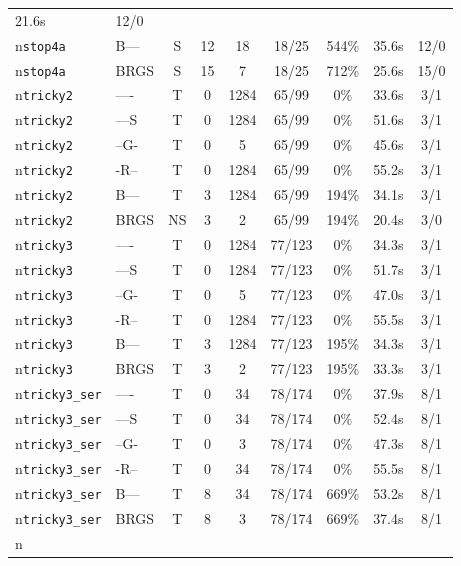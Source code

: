 \begin{tabular}{llccccccc}
21.6s & 12/0 \\n\texttt{stop4a} & B--- & S & 12 & 18 & 18/25 & 544\% & 35.6s & 12/0 \\n\texttt{stop4a} & BRGS & S & 15 & 7 & 18/25 & 712\% & 25.6s & 15/0 \\n\texttt{tricky2} & ---- & T & 0 & 1284 & 65/99 & 0\% & 33.6s & 3/1 \\n\texttt{tricky2} & ---S & T & 0 & 1284 & 65/99 & 0\% & 51.6s & 3/1 \\n\texttt{tricky2} & --G- & T & 0 & 5 & 65/99 & 0\% & 45.6s & 3/1 \\n\texttt{tricky2} & -R-- & T & 0 & 1284 & 65/99 & 0\% & 55.2s & 3/1 \\n\texttt{tricky2} & B--- & T & 3 & 1284 & 65/99 & 194\% & 34.1s & 3/1 \\n\texttt{tricky2} & BRGS & NS & 3 & 2 & 65/99 & 194\% & 20.4s & 3/0 \\n\texttt{tricky3} & ---- & T & 0 & 1284 & 77/123 & 0\% & 34.3s & 3/1 \\n\texttt{tricky3} & ---S & T & 0 & 1284 & 77/123 & 0\% & 51.7s & 3/1 \\n\texttt{tricky3} & --G- & T & 0 & 5 & 77/123 & 0\% & 47.0s & 3/1 \\n\texttt{tricky3} & -R-- & T & 0 & 1284 & 77/123 & 0\% & 55.5s & 3/1 \\n\texttt{tricky3} & B--- & T & 3 & 1284 & 77/123 & 195\% & 34.3s & 3/1 \\n\texttt{tricky3} & BRGS & T & 3 & 2 & 77/123 & 195\% & 33.3s & 3/1 \\n\texttt{tricky3\_ser} & ---- & T & 0 & 34 & 78/174 & 0\% & 37.9s & 8/1 \\n\texttt{tricky3\_ser} & ---S & T & 0 & 34 & 78/174 & 0\% & 52.4s & 8/1 \\n\texttt{tricky3\_ser} & --G- & T & 0 & 3 & 78/174 & 0\% & 47.3s & 8/1 \\n\texttt{tricky3\_ser} & -R-- & T & 0 & 34 & 78/174 & 0\% & 55.5s & 8/1 \\n\texttt{tricky3\_ser} & B--- & T & 8 & 34 & 78/174 & 669\% & 53.2s & 8/1 \\n\texttt{tricky3\_ser} & BRGS & T & 8 & 3 & 78/174 & 669\% & 37.4s & 8/1 \\n\bottomrule
\end{tabular}


